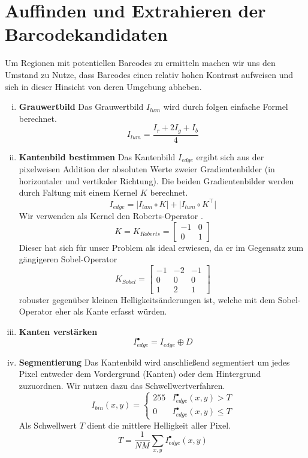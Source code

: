 \chapter{Auffinden und Extrahieren der Barcodekandidaten}
Um Regionen mit potentiellen Barcodes zu ermitteln machen wir uns den Umstand
zu Nutze, dass Barcodes einen relativ hohen Kontrast aufweisen und sich in
dieser Hinsicht von deren Umgebung abheben.

\begin{enumerate}[(i)]
  \item \textbf{Grauwertbild}
    Das Grauwertbild \( I_{lum} \) wird durch folgen einfache Formel berechnet.
    \[ I_{lum} = \frac{I_r + 2I_g + I_b}{4} \]

  \item \textbf{Kantenbild bestimmen}
    Das Kantenbild \( I_{edge} \) ergibt sich aus der pixelweisen Addition der
    absoluten Werte zweier Gradientenbilder (in horizontaler und vertikaler
    Richtung). Die beiden Gradientenbilder werden durch Faltung mit einem Kernel
    \( K \) berechnet.
    \[ I_{edge} = \Big| I_{lum} \circ K \Big|
                + \Big| I_{lum} \circ K^\top \Big|
    \]
    Wir verwenden als Kernel den Roberts-Operator
      \cite{DBLP:books/garland/Roberts63}.
    \[ K = K_{Roberts} = \left[ \begin{array}{cc}
         -1 & 0 \\
          0 & 1
       \end{array} \right]
    \]
    Dieser hat sich für unser Problem als ideal erwiesen, da er im Gegensatz zum
    gängigeren Sobel-Operator
    \[ K_{Sobel} = \left[ \begin{array}{ccc}
         -1 & -2 & -1 \\
          0 &  0 &  0 \\
          1 &  2 &  1
       \end{array} \right]
    \]
    robuster gegenüber kleinen Helligkeitsänderungen ist, welche mit dem
    Sobel-Operator eher als Kante erfasst würden.

  \item \textbf{Kanten verstärken}
    \[ I_{edge}^\bullet = I_{edge} \oplus D \]

  \item \textbf{Segmentierung}
    Das Kantenbild wird anschließend segmentiert um jedes Pixel entweder dem
    Vordergrund (Kanten) oder dem Hintergrund zuzuordnen. Wir nutzen dazu das
    Schwellwertverfahren.
    \[ I_{bin}(x,y) = \begin{cases}
         255 & I_{edge}^\bullet(x,y) > T \\
         0   & I_{edge}^\bullet(x,y) \leq T
       \end{cases}
    \]
    Als Schwellwert \( T \) dient die mittlere Helligkeit aller Pixel.
    \[ T = \frac{1}{NM} \sum_{x,y}{I_{edge}^\bullet(x,y)} \]
    

\end{enumerate}

